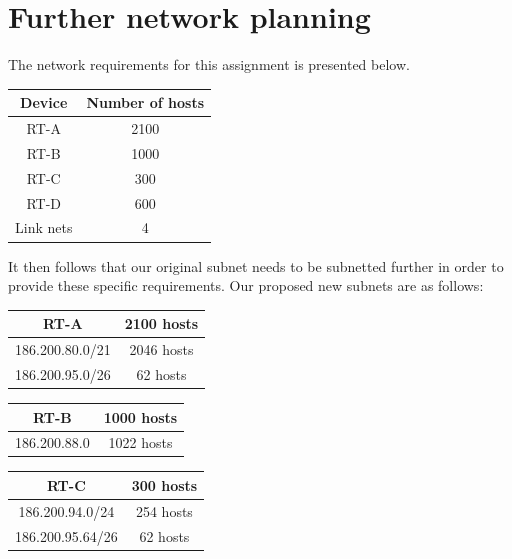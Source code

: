 \documentclass[a4paper, titlepage,12pt]{article}
\begin{document}
	\section{Further network planning}

		The network requirements for this assignment is presented below.

		\begin{center}
			\begin{tabular}{|c|c|}
				\hline
				\textbf{Device} & \textbf{Number of hosts} \\
				\hline
				RT-A & 2100 \\
				\hline
				RT-B & 1000 \\
				\hline
				RT-C & 300 \\
				\hline
				RT-D & 600 \\
				\hline
				Link nets & 4 \\
				\hline
			\end{tabular}
		\end{center}

		It then follows that our original subnet needs to be subnetted further in order to provide these specific requirements.
		Our proposed new subnets are as follows:

		\begin{center}
			\begin{tabular}{|c|c|}
				\hline
				RT-A & 2100 hosts \\
				\hline
				186.200.80.0/21 & 2046 hosts \\
				\hline
				186.200.95.0/26 & 62 hosts \\
				\hline
			\end{tabular}
		\end{center}

		\begin{center}
			\begin{tabular}{|c|c|}
				\hline
				RT-B & 1000 hosts \\
				\hline
				186.200.88.0 & 1022 hosts \\
				\hline
			\end{tabular}
		\end{center}

		\begin{center}
			\begin{tabular}{|c|c|}
				\hline
				RT-C & 300 hosts \\
				\hline
				186.200.94.0/24 & 254 hosts \\
				\hline
				186.200.95.64/26 & 62 hosts \\
				\hline
			\end{tabular}
		\end{center}
\end{document}
